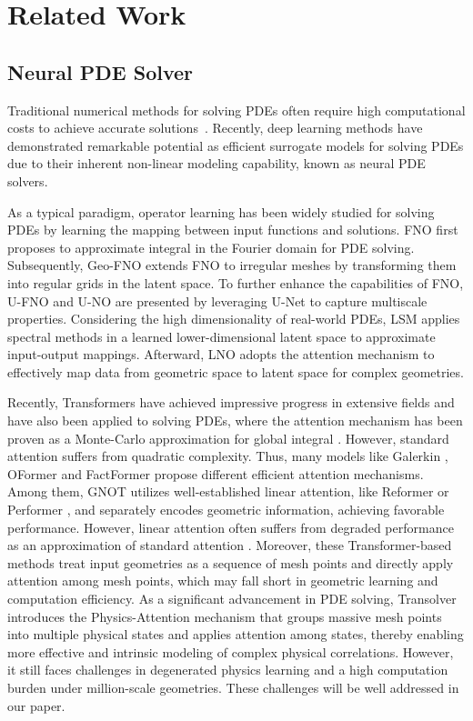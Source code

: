 \section{Related Work}
\vspace{-2pt}
\subsection{Neural PDE Solver}
Traditional numerical methods for solving PDEs often require high computational costs to achieve accurate solutions~\cite{solanki2003finite}. Recently, deep learning methods have demonstrated remarkable potential as efficient surrogate models for solving PDEs due to their inherent non-linear modeling capability, known as neural PDE solvers.

As a typical paradigm, operator learning has been widely studied for solving PDEs by learning the mapping between input functions and solutions. FNO \cite{li2020neural} first proposes to approximate integral in the Fourier domain for PDE solving. Subsequently, Geo-FNO \cite{li2021fourier} extends FNO to irregular meshes by transforming them into regular grids in the latent space. To further enhance the capabilities of FNO, U-FNO \citet{Wen2021UFNOA} and U-NO \citet{rahman2022u} are presented by leveraging U-Net \cite{ronneberger2015u} to capture multiscale properties. Considering the high dimensionality of real-world PDEs, LSM \cite{wu2023LSM} applies spectral methods in a learned lower-dimensional latent space to approximate input-output mappings. Afterward, LNO \cite{wang2024LNO} adopts the attention mechanism to effectively map data from geometric space to latent space for complex geometries.

Recently, Transformers \cite{NIPS2017_3f5ee243} have achieved impressive progress in extensive fields and have also been applied to solving PDEs, where the attention mechanism has been proven as a Monte-Carlo approximation for global integral \cite{jmlr_operator}. However, standard attention suffers from quadratic complexity. Thus, many models like Galerkin \cite{Cao2021ChooseAT}, OFormer \cite{li2023transformer} and FactFormer \cite{anonymous2023factorized} propose different efficient attention mechanisms. Among them, GNOT \cite{hao2023gnot} utilizes well-established linear attention, like Reformer or Performer \cite{kitaev2020reformer,performer}, and separately encodes geometric information, achieving favorable performance. However, linear attention often suffers from degraded performance as an approximation of standard attention \cite{qin2022devil}. Moreover, these Transformer-based methods treat input geometries as a sequence of mesh points and directly apply attention among mesh points, which may fall short in geometric learning and computation efficiency. As a significant advancement in PDE solving, Transolver~\cite{wu2024Transolver} introduces the Physics-Attention mechanism that groups massive mesh points into multiple physical states and applies attention among states, thereby enabling more effective and intrinsic modeling of complex physical correlations. However, it still faces challenges in degenerated physics learning and a high computation burden under million-scale geometries. These challenges will be well addressed in our paper.

